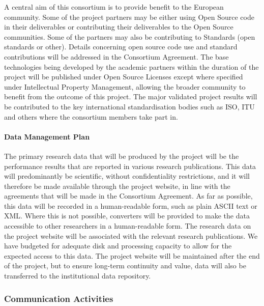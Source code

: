 \documentclass[a4paper,11pt]{article}
\begin{document}
A central aim of this consortium is to provide benefit to the European community.  Some of the project partners may be either using Open Source code in their deliverables or contributing their deliverables to the Open
Source communities. Some of the partners may also be contributing to Standards (open standards or other). Details concerning open source code use and standard contributions will be
addressed in the Consortium Agreement.
The base technologies being developed by the academic partners within the duration of the project will be published under Open Source Licenses except where specified under Intellectual Property Management, allowing the broader community to benefit from the outcome of this project.
The major validated project results  will be contributed to the key international standardisation bodies  such as ISO, ITU and others where the consortium members take part in. 


\paragraph{Data Management Plan}

The primary research data that will be produced by the project will be the performance results that are reported in
various research publications.  This data will predominantly be scientific,
without confidentiality restrictions, and it will
therefore be made available through the project website, in line with the agreements that will be
made in the Consortium Agreement.  As far as possible, 
this data will be recorded in a human-readable form, such as plain ASCII text
or XML.  Where this is not possible, converters will be provided to make the data accessible to other researchers
in a human-readable form. 
The research data on the project website will be associated with the relevant research publications. 
We have budgeted for adequate disk and processing capacity to allow for the expected access to this data.
The project website will be maintained after the end of the project, but to ensure long-term continuity
and value, data will also be transferred to the \SAshort{} institutional data repository.

\draftpage
\subsubsection{Communication Activities}
\label{sect:comm-activities}

\end{document}
